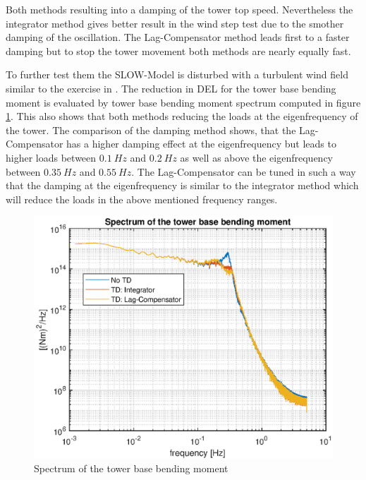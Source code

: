 Both methods resulting into a damping of the tower top speed. Nevertheless the integrator method gives better result in the wind step test due to the smother damping of the oscillation. The Lag-Compensator method leads first to a faster damping but to stop the tower movement both methods are nearly equally fast. 

To further test them the SLOW-Model is disturbed with a turbulent wind field similar to the exercise in \cite{2024}. The reduction in DEL for the tower base bending moment is evaluated by tower base bending moment spectrum computed in figure \ref{fig:TDDEL}. This also shows that both methods reducing the loads at the eigenfrequency of the tower. The comparison of the damping method shows, that the Lag-Compensator has a higher damping effect at the eigenfrequency but leads to higher loads between $\SI{0.1}{Hz}$ and $\SI{0.2}{Hz}$ as well as above the eigenfrequency between $\SI{0.35}{Hz}$ and $\SI{0.55}{Hz}$. The Lag-Compensator can be tuned in such a way that the damping at the eigenfrequency is similar to the integrator method which will reduce the loads in the above mentioned frequency ranges.
\begin{figure}[tbh]
	\centering	
	\includegraphics[width=12cm]{Figures/TDSpectrum.eps}
	\caption{Spectrum of the tower base bending moment}
	\label{fig:TDDEL}
\end{figure}      